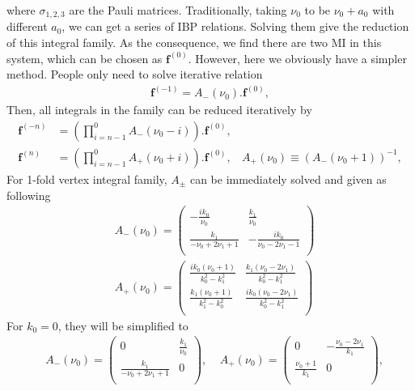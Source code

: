 \documentclass[a4paper,11pt]{article}
\newcommand{\nn}{\nonumber}
\begin{document}
where $\sigma_{1,2,3}$ are the Pauli matrices. Traditionally, taking $\nu_0$ to be $\nu_0+a_0$ with different $a_0$, we can get a series of IBP relations. Solving them give the reduction of this integral family. As the consequence, we find there are two MI in this system, which can be chosen as $\bm{f}^{(0)}$. However, here we obviously have a simpler method. People only need to solve iterative relation
\begin{align}
\bm{f}^{(-1)}=A_-(\nu_0).\bm{f}^{(0)},
\end{align}
Then, all integrals in the family can be reduced iteratively by
\begin{align}
\bm{f}^{(-n)}&=\left(\prod_{i=n-1}^0 A_-(\nu_0-i) \right) . \bm{f}^{(0)},\nn\\
\bm{f}^{(n)}&=\left(\prod_{i=n-1}^0 A_+(\nu_0+i)\right) . \bm{f}^{(0)},~~~~ A_+(\nu_0)\equiv \left(A_-(\nu_0+1)\right)^{-1},
\end{align}
For 1-fold vertex integral family, $A_\pm$ can be immediately solved and given as following
\begin{align}
&A_-(\nu_0) = \left(
\begin{array}{cc}
 -\frac{i k_0}{\nu _0} & \frac{k_1}{\nu _0} \\
 \frac{k_1}{-\nu _0+2 \nu _1+1} & -\frac{i k_0}{\nu _0-2 \nu _1-1} \\
\end{array}
\right) \nn\\
&A_+(\nu_0)=\left(
\begin{array}{cc}
 \frac{i k_0 \left(\nu _0+1\right)}{k_0^2-k_1^2} & \frac{k_1 \left(\nu _0-2 \nu _1\right)}{k_0^2-k_1^2} \\
 \frac{k_1 \left(\nu _0+1\right)}{k_1^2-k_0^2} & \frac{i k_0 \left(\nu _0-2 \nu _1\right)}{k_0^2-k_1^2} \\
\end{array}
\right) \label{eq:1Hreduce}
\end{align}
For $k_0=0$, they will be simplified to
\begin{align}
&A_-(\nu_0) =\left(
\begin{array}{cc}
 0 & \frac{k_1}{\nu _0} \\
 \frac{k_1}{-\nu _0+2 \nu _1+1} & 0 \\
\end{array}
\right) ,~~~~~A_+(\nu_0)=\left(
\begin{array}{cc}
 0 & -\frac{\nu _0-2 \nu _1}{k_1} \\
 \frac{\nu _0+1}{k_1} & 0 \\
\end{array}
\right), \label{eq:1Hreducek00}
\end{align}
\end{document}
